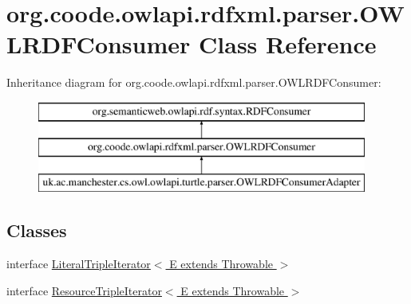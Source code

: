 \hypertarget{classorg_1_1coode_1_1owlapi_1_1rdfxml_1_1parser_1_1_o_w_l_r_d_f_consumer}{\section{org.\-coode.\-owlapi.\-rdfxml.\-parser.\-O\-W\-L\-R\-D\-F\-Consumer Class Reference}
\label{classorg_1_1coode_1_1owlapi_1_1rdfxml_1_1parser_1_1_o_w_l_r_d_f_consumer}
}
Inheritance diagram for org.\-coode.\-owlapi.\-rdfxml.\-parser.\-O\-W\-L\-R\-D\-F\-Consumer\-:\begin{figure}[H]
\begin{center}
\leavevmode
\includegraphics[height=3.000000cm]{classorg_1_1coode_1_1owlapi_1_1rdfxml_1_1parser_1_1_o_w_l_r_d_f_consumer}
\end{center}
\end{figure}
\subsection*{Classes}
\begin{DoxyCompactItemize}
\item 
interface \hyperlink{interfaceorg_1_1coode_1_1owlapi_1_1rdfxml_1_1parser_1_1_o_w_l_r_d_f_consumer_1_1_literal_triple_72e43583cd8bf74f09ef2063bc222d8f}{Literal\-Triple\-Iterator$<$ E extends Throwable $>$}
\item 
interface \hyperlink{interfaceorg_1_1coode_1_1owlapi_1_1rdfxml_1_1parser_1_1_o_w_l_r_d_f_consumer_1_1_resource_triple4e0fef2a7cf6998cb94ca5620cceaf4b}{Resource\-Triple\-Iterator$<$ E extends Throwable $>$}
\end{DoxyCompactItemize}
